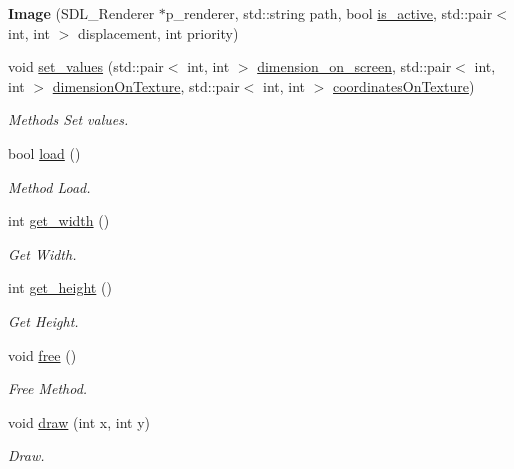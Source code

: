 \begin{DoxyCompactItemize}
\item 
{\bfseries Image} (S\+D\+L\+\_\+\+Renderer $\ast$p\+\_\+renderer, std\+::string path, bool \hyperlink{classengine_1_1_component_ae1a97027b9862ee3e41e6566501d765e}{is\+\_\+active}, std\+::pair$<$ int, int $>$ displacement, int priority)\hypertarget{classengine_1_1_image_aa3429cf7f78e43a8c28a536f6849716c}{}\label{classengine_1_1_image_aa3429cf7f78e43a8c28a536f6849716c}

\item 
void \hyperlink{classengine_1_1_image_aa0ed04e99b416fb5780f0c7ceb99f843}{set\+\_\+values} (std\+::pair$<$ int, int $>$ \hyperlink{classengine_1_1_image_abbbfdb4ce895511ce54105078fb39ebb}{dimension\+\_\+on\+\_\+screen}, std\+::pair$<$ int, int $>$ \hyperlink{classengine_1_1_image_aae242af0f586f7c31ffe38657bd0506c}{dimension\+On\+Texture}, std\+::pair$<$ int, int $>$ \hyperlink{classengine_1_1_image_ab050b1278f3e32a44ceffe9365aa867b}{coordinates\+On\+Texture})
\begin{DoxyCompactList}\small\item\em Methods Set values. \end{DoxyCompactList}\item 
bool \hyperlink{classengine_1_1_image_a1a393960f7402515428bd982c32f59af}{load} ()
\begin{DoxyCompactList}\small\item\em Method Load. \end{DoxyCompactList}\item 
int \hyperlink{classengine_1_1_image_a4eeafefc0bae9658ffe8877c5cf681e7}{get\+\_\+width} ()
\begin{DoxyCompactList}\small\item\em Get Width. \end{DoxyCompactList}\item 
int \hyperlink{classengine_1_1_image_a5082f1fdc63e6bb76a105348e72e2e02}{get\+\_\+height} ()
\begin{DoxyCompactList}\small\item\em Get Height. \end{DoxyCompactList}\item 
void \hyperlink{classengine_1_1_image_aa70272a861bcaa5297e6967c9106197f}{free} ()
\begin{DoxyCompactList}\small\item\em Free Method. \end{DoxyCompactList}\item 
void \hyperlink{classengine_1_1_image_a45ce17ceb8619e732f2d09ec6d1cc1b9}{draw} (int x, int y)
\begin{DoxyCompactList}\small\item\em Draw. \end{DoxyCompactList}\end{DoxyCompactItemize}
